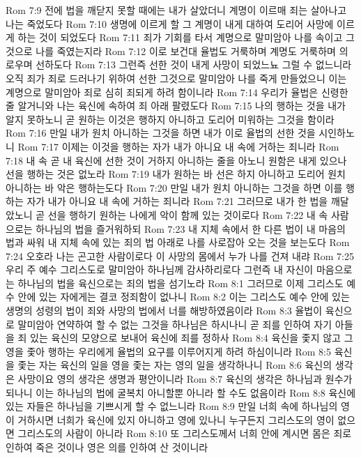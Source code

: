 Rom 7:9  전에 법을 깨닫지 못할 때에는 내가 살았더니 계명이 이르매 죄는 살아나고 나는 죽었도다
Rom 7:10  생명에 이르게 할 그 계명이 내게 대하여 도리어 사망에 이르게 하는 것이 되었도다
Rom 7:11  죄가 기회를 타서 계명으로 말미암아 나를 속이고 그것으로 나를 죽였는지라
Rom 7:12  이로 보건대 율법도 거룩하며 계명도 거룩하며 의로우며 선하도다
Rom 7:13  그런즉 선한 것이 내게 사망이 되었느뇨 그럴 수 없느니라 오직 죄가 죄로 드러나기 위하여 선한 그것으로 말미암아 나를 죽게 만들었으니 이는 계명으로 말미암아 죄로 심히 죄되게 하려 함이니라
Rom 7:14  우리가 율법은 신령한 줄 알거니와 나는 육신에 속하여 죄 아래 팔렸도다
Rom 7:15  나의 행하는 것을 내가 알지 못하노니 곧 원하는 이것은 행하지 아니하고 도리어 미워하는 그것을 함이라
Rom 7:16  만일 내가 원치 아니하는 그것을 하면 내가 이로 율법의 선한 것을 시인하노니
Rom 7:17  이제는 이것을 행하는 자가 내가 아니요 내 속에 거하는 죄니라
Rom 7:18  내 속 곧 내 육신에 선한 것이 거하지 아니하는 줄을 아노니 원함은 내게 있으나 선을 행하는 것은 없노라
Rom 7:19  내가 원하는 바 선은 하지 아니하고 도리어 원치 아니하는 바 악은 행하는도다
Rom 7:20  만일 내가 원치 아니하는 그것을 하면 이를 행하는 자가 내가 아니요 내 속에 거하는 죄니라
Rom 7:21  그러므로 내가 한 법을 깨달았노니 곧 선을 행하기 원하는 나에게 악이 함께 있는 것이로다
Rom 7:22  내 속 사람으로는 하나님의 법을 즐거워하되
Rom 7:23  내 지체 속에서 한 다른 법이 내 마음의 법과 싸워 내 지체 속에 있는 죄의 법 아래로 나를 사로잡아 오는 것을 보는도다
Rom 7:24  오호라 나는 곤고한 사람이로다 이 사망의 몸에서 누가 나를 건져 내랴
Rom 7:25  우리 주 예수 그리스도로 말미암아 하나님께 감사하리로다 그런즉 내 자신이 마음으로는 하나님의 법을 육신으로는 죄의 법을 섬기노라
Rom 8:1  그러므로 이제 그리스도 예수 안에 있는 자에게는 결코 정죄함이 없나니
Rom 8:2  이는 그리스도 예수 안에 있는 생명의 성령의 법이 죄와 사망의 법에서 너를 해방하였음이라
Rom 8:3  율법이 육신으로 말미암아 연약하여 할 수 없는 그것을 하나님은 하시나니 곧 죄를 인하여 자기 아들을 죄 있는 육신의 모양으로 보내어 육신에 죄를 정하사
Rom 8:4  육신을 좇지 않고 그 영을 좇아 행하는 우리에게 율법의 요구를 이루어지게 하려 하심이니라
Rom 8:5  육신을 좇는 자는 육신의 일을 영을 좇는 자는 영의 일을 생각하나니
Rom 8:6  육신의 생각은 사망이요 영의 생각은 생명과 평안이니라
Rom 8:7  육신의 생각은 하나님과 원수가 되나니 이는 하나님의 법에 굴복치 아니할뿐 아니라 할 수도 없음이라
Rom 8:8  육신에 있는 자들은 하나님을 기쁘시게 할 수 없느니라
Rom 8:9  만일 너희 속에 하나님의 영이 거하시면 너희가 육신에 있지 아니하고 영에 있나니 누구든지 그리스도의 영이 없으면 그리스도의 사람이 아니라
Rom 8:10  또 그리스도께서 너희 안에 계시면 몸은 죄로 인하여 죽은 것이나 영은 의를 인하여 산 것이니라
